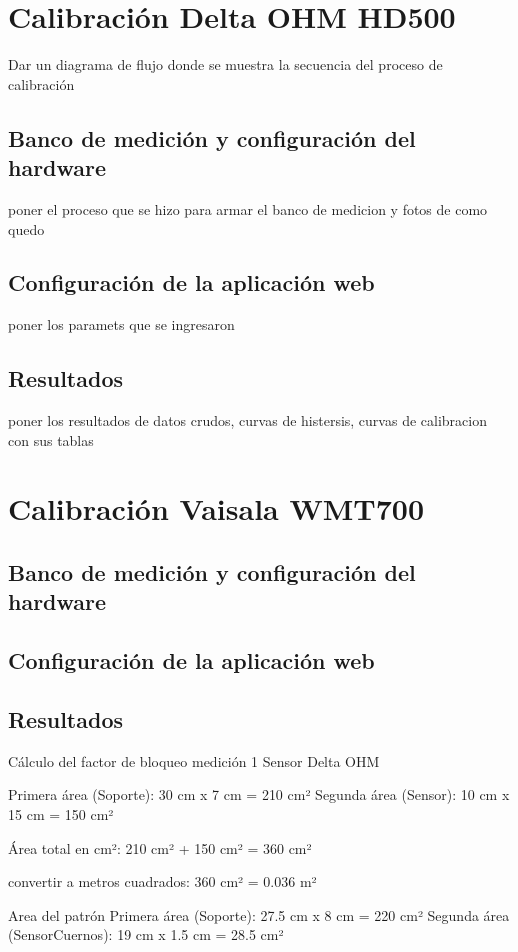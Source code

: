 \section{Calibración Delta OHM HD500}
Dar un diagrama de flujo donde se muestra la secuencia del proceso de calibración


\subsection{Banco de medición y configuración del hardware}
poner el proceso que se hizo para armar el banco de medicion y fotos de como quedo
 
\subsection{Configuración de la aplicación web}

poner los paramets que se ingresaron
\subsection{Resultados}

poner los resultados de datos crudos, curvas de histersis, curvas de calibracion 
con sus tablas

\section{Calibración Vaisala WMT700}
\subsection{Banco de medición y configuración del hardware}
\subsection{Configuración de la aplicación web}
\subsection{Resultados}


Cálculo del factor de bloqueo medición 1
Sensor Delta OHM

Primera área (Soporte): 30 cm x 7 cm = 210 cm²
Segunda área (Sensor): 10 cm x 15 cm = 150 cm²

Área total en cm²: 210 cm² + 150 cm² = 360 cm²

convertir a metros cuadrados:
360 cm² = 0.036 m²


Area del patrón
Primera área (Soporte): 27.5 cm x 8 cm = 220 cm²
Segunda área (SensorCuernos): 19 cm x 1.5 cm = 28.5 cm²

